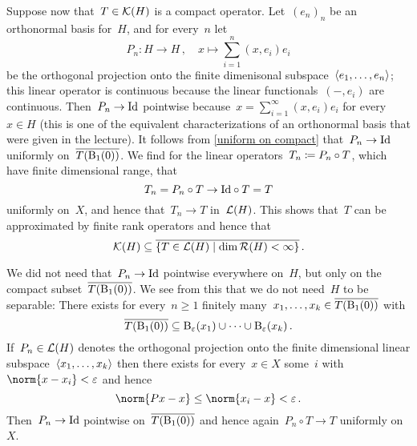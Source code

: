 Suppose now that~$T \in \mathcal{K}(H)$ is a compact operator.
Let~$(e_n)_n$ be an orthonormal basis for~$H$, and for every~$n$ let
\[
  P_n
  \colon
  H
  \to
  H \,,
  \quad
  x
  \mapsto
  \sum_{i=1}^n (x,e_i) e_i
\]
be the orthogonal projection onto the finite dimenisonal subspace~$\langle e_1, \dotsc, e_n\rangle$;
this linear operator is continuous because the linear functionals~$(-,e_i)$ are continuous.
Then~$P_n \to \operatorname{Id}$ pointwise because~$x = \sum_{i=1}^\infty (x, e_i) e_i$ for every~$x \in H$ (this is one of the equivalent characterizations of an orthonormal basis that were given in the lecture).
It follows from \cref{uniform on compact} that~$P_n \to \operatorname{Id}$ uniformly on~$\overline{T(\operatorname{B}_{1}(0))}$.
We find for the linear operators~$T_n \coloneqq P_n \circ T$, which have finite dimensional range, that
\[
  T_n
  =
  P_n \circ T
  \to
  {\operatorname{Id}} \circ T
  = T
\]
uniformly on~$X$, and hence that~$T_n \to T$ in~$\mathcal{L}(H)$.
This shows that~$T$ can be approximated by finite rank operators and hence that
\[
  \Compact(H)
  \subseteq
  \closure{
  \{
    T \in \Lin(H)
  \suchthat
    \dim \Range(H) < \infty
  \}
  } \,.
\]


\begin{remark}
  We did not need that~$P_n \to \operatorname{Id}$ pointwise everywhere on~$H$, but only on the compact subset~$\overline{T(\operatorname{B}_{1}(0))}$.
  We see from this that we do not need~$H$ to be separable:
  There exists for every~$n \geq 1$ finitely many~$x_1, \dotsc, x_k \in \overline{T(\operatorname{B}_{1}(0))}$ with
  \[
    \overline{T(\operatorname{B}_{1}(0))}
    \subseteq
    \operatorname{B}_{\varepsilon}(x_1) \cup \dotsb \cup \operatorname{B}_{\varepsilon}(x_k) \,.
  \]
  If~$P_n \in \mathcal{L}(H)$ denotes the orthogonal projection onto the finite dimensional linear subspace~$\langle x_1, \dotsc, x_k\rangle$ then there exists for every~$x \in X$ some~$i$ with~$\norm{x - x_i} < \varepsilon$ and hence
  \[
    \norm{P x - x}
    \leq
    \norm{x_i - x}
    <
    \varepsilon \,.
  \]
  Then~$P_n \to \operatorname{Id}$ pointwise on~$\overline{T(\operatorname{B}_{1}(0))}$ and hence again~$P_n \circ T \to T$ uniformly on~$X$.
\end{remark}



